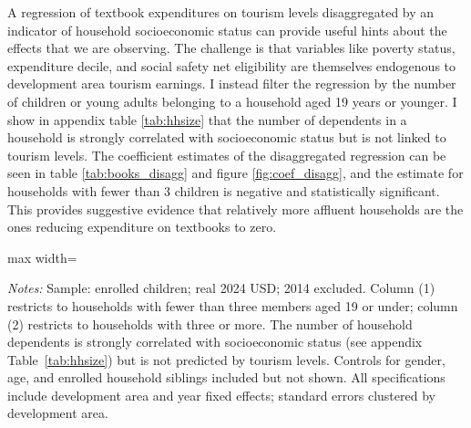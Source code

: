 \documentclass[12pt]{article}
\newcommand*{\TableLagOnePath}{../Paper_3_Tables/Lagged_1Year_Tables}
\begin{document}
  A regression of textbook expenditures on tourism levels disaggregated by an indicator of household socioeconomic status can provide useful hints about the effects that we are observing. The challenge is that variables like poverty status, expenditure decile, and social safety net eligibility are themselves endogenous to development area tourism earnings. I instead filter the regression by the number of children or young adults belonging to a household aged 19 years or younger. I show in appendix table \ref{tab:hhsize} that the number of dependents in a household is strongly correlated with socioeconomic status but is not linked to tourism levels. The coefficient estimates of the disaggregated regression can be seen in table \ref{tab:books_disagg} and figure \ref{fig:coef_disagg}, and the estimate for households with fewer than 3 children is negative and statistically significant. This provides suggestive evidence that relatively more affluent households are the ones reducing expenditure on textbooks to zero.

	\begin{table}[htbp]
	\centering
	\begin{adjustbox}{max width=\textwidth}
	\begin{threeparttable}
		\caption{Book Spending by Household Dependent Count, IV Estimates}
		\label{tab:books_disagg}
		{\small}
		\begin{tablenotes}
			\small
			\item \textit{Notes:} Sample: enrolled children; real 2024 USD; 2014 excluded. Column (1) restricts to households with fewer than three members aged 19 or under; column (2) restricts to households with three or more. The number of household dependents is strongly correlated with socioeconomic status (see appendix Table~\ref{tab:hhsize}) but is not predicted by tourism levels. Controls for gender, age, and enrolled household siblings included but not shown. All specifications include development area and year fixed effects; standard errors clustered by development area.
		\end{tablenotes}
	\end{threeparttable}
	\end{adjustbox}
	\end{table}
\end{document}
